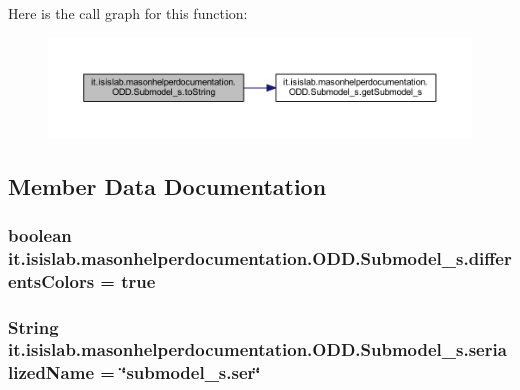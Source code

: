 Here is the call graph for this function\-:\nopagebreak
\begin{figure}[H]
\begin{center}
\leavevmode
\includegraphics[width=350pt]{classit_1_1isislab_1_1masonhelperdocumentation_1_1_o_d_d_1_1_submodel__s_a4f23339b028b73e93d58b4aa051b9947_cgraph}
\end{center}
\end{figure}




\subsection{Member Data Documentation}
\hypertarget{classit_1_1isislab_1_1masonhelperdocumentation_1_1_o_d_d_1_1_submodel__s_a135ce4524aa1bc14a7e6c653e47f188e}{
\subsubsection[{differents\-Colors}]{\setlength{\rightskip}{0pt plus 5cm}boolean it.\-isislab.\-masonhelperdocumentation.\-O\-D\-D.\-Submodel\-\_\-s.\-differents\-Colors = true\hspace{0.3cm}{\ttfamily [static]}}}\label{classit_1_1isislab_1_1masonhelperdocumentation_1_1_o_d_d_1_1_submodel__s_a135ce4524aa1bc14a7e6c653e47f188e}
\hypertarget{classit_1_1isislab_1_1masonhelperdocumentation_1_1_o_d_d_1_1_submodel__s_a7f63b7178d8b6b8d9da0c24d79f031f6}{
\subsubsection[{serialized\-Name}]{\setlength{\rightskip}{0pt plus 5cm}String it.\-isislab.\-masonhelperdocumentation.\-O\-D\-D.\-Submodel\-\_\-s.\-serialized\-Name = \char`\"{}submodel\-\_\-s.\-ser\char`\"{}\hspace{0.3cm}{\ttfamily [static]}}}\label{classit_1_1isislab_1_1masonhelperdocumentation_1_1_o_d_d_1_1_submodel__s_a7f63b7178d8b6b8d9da0c24d79f031f6}

